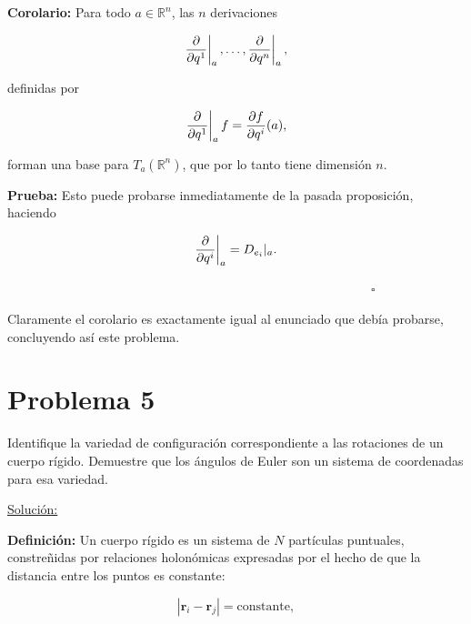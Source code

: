 \documentclass[a4paper,10pt]{article}
\numberwithin{equation}{section}
\newcommand{\zerodel}{.\kern-\nulldelimiterspace}
\newcommand{\definicion}{\textbf{Definición: }}
\newcommand{\prueba}{\textbf{Prueba: }}
\newcommand{\corolario}{\textbf{Corolario: }}
\begin{document}
\vspace{.3cm}

\corolario Para todo $a \in \mathbb{R}^n$, las $n$ derivaciones 

\begin{equation}
 \left\zerodel\frac{\partial}{\partial q^1}\right|_a, \dots, 
  \left\zerodel\frac{\partial}{\partial q^n}\right|_a,
\end{equation}

definidas por 

\begin{equation}
  \left\zerodel\frac{\partial}{\partial q^1}\right|_a f = 
  \frac{\partial f}{\partial q^i}(a),
\end{equation}

forman una base para $T_a(\mathbb{R}^n)$, que por lo tanto tiene 
dimensión $n$.

\vspace{.3cm}

\prueba Esto puede probarse inmediatamente de la pasada proposición, 
haciendo 

\begin{equation}
 \left\zerodel\frac{\partial}{\partial q^i}\right|_a = D_{e_{i}}|_a. 
\end{equation}

$\hspace{12cm} \square$

Claramente el corolario es exactamente igual al enunciado que debía 
probarse, concluyendo así este problema.

\section{Problema 5}

Identifique la variedad de configuración correspondiente a las rotaciones de un cuerpo 
rígido. Demuestre que los ángulos de Euler son un sistema de coordenadas para esa 
variedad.

\vspace{.3cm}

\underline{Solución:} \vspace{.3cm}

\definicion Un cuerpo rígido es un sistema de $N$ partículas puntuales, constreñidas 
por relaciones holonómicas expresadas por el hecho de que la distancia entre los 
puntos es constante:

\begin{equation}
 |\mathbf{r}_i - \mathbf{r}_j| = \text{constante},
\end{equation}
\end{document}
